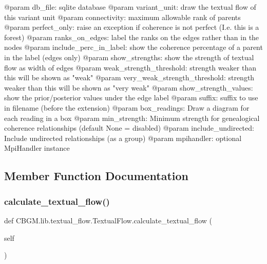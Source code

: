 \begin{DoxyVerb}@param db_file: sqlite database
@param variant_unit: draw the textual flow of this variant unit
@param connectivity: maximum allowable rank of parents
@param perfect_only: raise an exception if coherence is not perfect (I.e. this is a forest)
@param ranks_on_edges: label the ranks on the edges rather than in the nodes
@param include_perc_in_label: show the coherence percentage of a parent in the label (edges only)
@param show_strengths: show the strength of textual flow as width of edges
@param weak_strength_threshold: strength weaker than this will be shown as "weak"
@param very_weak_strength_threshold: strength weaker than this will be shown as "very weak"
@param show_strength_values: show the prior/posterior values under the edge label
@param suffix: suffix to use in filename (before the extension)
@param box_readings: Draw a diagram for each reading in a box
@param min_strength: Minimum strength for genealogical coherence relationships (default None = disabled)
@param include_undirected: Include undirected relationships (as a group)
@param mpihandler: optional MpiHandler instance
\end{DoxyVerb}
 

\subsection{Member Function Documentation}
\mbox{\label{classCBGM_1_1lib_1_1textual__flow_1_1TextualFlow_adc75c15bd885bfbd38c1a67c45acef88}} 
\subsubsection{\texorpdfstring{calculate\+\_\+textual\+\_\+flow()}{calculate\_textual\_flow()}}
{\footnotesize\ttfamily def C\+B\+G\+M.\+lib.\+textual\+\_\+flow.\+Textual\+Flow.\+calculate\+\_\+textual\+\_\+flow (\begin{DoxyParamCaption}\item[{}]{self }\end{DoxyParamCaption})}

